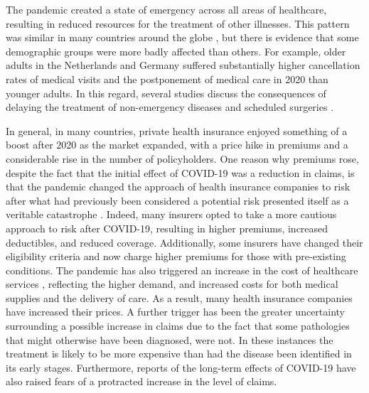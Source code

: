\documentclass[]{risa}
\begin{document}
The pandemic created a state of emergency across all areas of healthcare, resulting in reduced resources for the treatment of other illnesses. This pattern was similar in many countries around the globe \cite{xu2021impact, mogharab2022global}, but there is evidence that some demographic groups were more badly affected than others. For example, older adults in the Netherlands \cite{mizee2022delay} and Germany \cite{michalowsky2021effect} suffered substantially higher cancellation rates of medical visits and the postponement of medical care in 2020 than younger adults. In this regard, several studies discuss the consequences of delaying the treatment of non-emergency diseases \cite{kim2022impactb, kotrych2022delay, di2022impact} and scheduled surgeries \cite{ricciardiello2021impact}.

In general, in many countries, private health insurance enjoyed something of a boost after 2020 as the market expanded, with a price hike in premiums and a considerable rise in the number of policyholders. One reason why premiums rose, despite the fact that the initial effect of COVID-19 was a reduction in claims, is that the pandemic changed the approach of health insurance companies to risk after what had previously been considered a potential risk presented itself as a veritable catastrophe \cite{richter2020covid}. Indeed, many insurers opted to take a more cautious approach to risk after COVID-19, resulting in higher premiums, increased deductibles, and reduced coverage. Additionally, some insurers have changed their eligibility criteria and now charge higher premiums for those with pre-existing conditions. The pandemic has also triggered an increase in the cost of healthcare services \cite{poisal2022national}, reflecting the higher demand, and increased costs for both medical supplies and the delivery of care. As a result, many health insurance companies have increased their prices. A further trigger has been the greater uncertainty surrounding a possible increase in claims due to the fact that some pathologies that might otherwise have been diagnosed, were not. In these instances the treatment is likely to be more expensive than had the disease been identified in its early stages. Furthermore, reports of the long-term effects of COVID-19 have also raised fears of a protracted increase in the level of claims.
\end{document}

